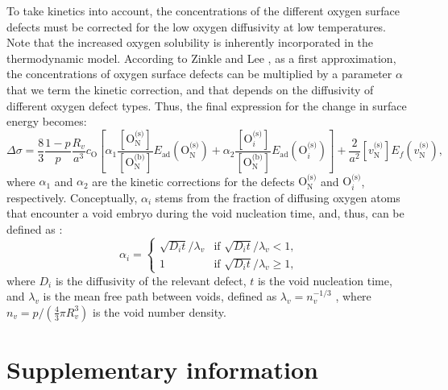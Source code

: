 \documentclass[preprint,12pt,sort&compress]{elsarticle}
\newcommand{\?}{\stackrel{?}{=}}
\begin{document}
To take kinetics into account, the concentrations of the different oxygen surface defects must be corrected for the low oxygen diffusivity at low temperatures. Note that the increased oxygen solubility is inherently incorporated in the thermodynamic model. According to Zinkle and Lee \cite{Zinkle1990}, as a first approximation, the concentrations of oxygen surface defects can be multiplied by a parameter $\alpha$ that we term the kinetic correction, and that depends on the diffusivity of different oxygen defect types. Thus, the final expression for the change in surface energy becomes:
\begin{equation}
\Delta \sigma = \frac{8}{3} \frac{1-p}{p} \frac{R_v}{a^3} c_\text{O} \left[ \alpha_1 \frac{ [ \text{O}_\text{N}^{\text{(s)}} ] }{ [ \text{O}_\text{N}^{\text{(b)}} ] }  E_\text{ad}( \text{O}_\text{N}^{\text{(s)}} ) + \alpha_2 \frac{ [ \text{O}_i^{\text{(s)}} ] }{ [ \text{O}_\text{N}^{\text{(b)}} ] }  E_\text{ad}( \text{O}_i^{\text{(s)}} ) \right] + \frac{2}{a^2} [ v_\text{N}^{\text{(s)}} ] E_f ( v_\text{N}^{\text{(s)}} ),
\end{equation}
where $\alpha_1$ and $\alpha_2$ are the kinetic corrections for the defects $\text{O}_\text{N}^\text{(s)}$ and $\text{O}_i^{\text{(s)}}$, respectively. Conceptually, $\alpha_i$ stems from the fraction of diffusing oxygen atoms that encounter a void embryo during the void nucleation time, and, thus, can be defined as \cite{Zinkle1990}:
\begin{equation}
\alpha_i =
\begin{cases}
    \sqrt{D_i t}/\lambda_v & \text{if } \sqrt{D_i t}/\lambda_v < 1, \\
    1 & \text{if } \sqrt{D_i t}/\lambda_v \geq 1,
\end{cases}    
\end{equation}
where $D_i$ is the diffusivity of the relevant defect, $t$ is the void nucleation time, and $\lambda_v$ is the mean free path between voids, defined as $\lambda_v = n_v^{-1/3}$ \cite{Olander2021}, where $n_v = p / ( \frac{4}{3} \pi R_v^3 ) $ is the void number density.

\FloatBarrier

\section{Supplementary information}
\label{App3}

\end{document}

